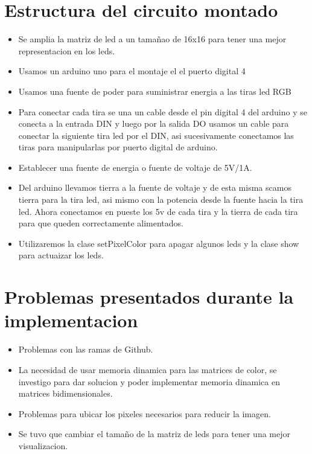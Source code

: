 \documentclass{article}
\begin{document}
\section{Estructura del circuito montado}

\begin{itemize}
\item Se amplia la matriz de led a un tamañao de 16x16 para tener una mejor representacion en los leds.
\item Usamos un arduino uno para el montaje el el puerto digital 4
\item Usamos una fuente de poder para suministrar energia a las tiras led RGB
\item Para conectar cada tira se una un cable desde el pin digital  4 del arduino y se conecta a la entrada DIN y luego por la salida DO usamos un cable para conectar la siguiente tira led por el DIN, asi sucesivamente conectamos las tiras para manipularlas por puerto digital de arduino.
\item Establecer una fuente de energia o  fuente de voltaje de 5V/1A.
\item Del arduino llevamos tierra a la fuente de voltaje y de esta misma scamos tierra para la tira led, asi mismo con la potencia desde la fuente hacia la tira led. Ahora conectamos en pueste los 5v de cada tira y la tierra de cada tira para que queden correctamente alimentados.
\item Utilizaremos la clase setPixelColor para apagar algunos leds y la clase show para actuaizar los leds.

\end{itemize}

\section{Problemas presentados durante la implementacion}

\begin{itemize}
\item Problemas con las ramas de Github.
\item La necesidad de usar memoria dinamica para las matrices de color, se investigo para dar solucion y poder implementar memoria dinamica en matrices bidimensionales.
\item Problemas para ubicar los pixeles necesarios para reducir la imagen.
\item Se tuvo que cambiar el tamaño de la matriz de leds para tener una mejor visualizacion.


\end{itemize}
\end{document}

